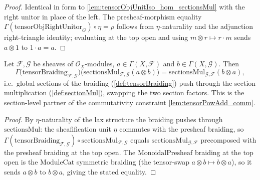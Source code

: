 \begin{proof}
  \leanok
  Identical in form to \cref{lem:tensorObjUnitIso_hom_sectionsMul} with the right
  unitor in place of the left. The presheaf-morphism equality
  \(\Gamma(\mathrm{tensorObjRightUnitor}_G) \circ \eta = \rho\) follows from
  \(\eta\)-naturality and the adjunction right-triangle identity; evaluating at the
  top open and using \(m \otimes r \mapsto r \cdot m\) sends \(a \otimes 1\) to
  \(1 \cdot a = a\).
\end{proof}

\begin{lemma}

  \label{lem:tensorBraiding_hom_sectionsMul}
  Let \(\mathcal{F}, \mathcal{G}\) be sheaves of \(\mathcal{O}_X\)-modules,
  \(a \in \Gamma(X,\mathcal{F})\) and \(b \in \Gamma(X,\mathcal{G})\). Then
  \[
    \Gamma\bigl(\mathrm{tensorBraiding}_{\mathcal{F},\mathcal{G}}\bigr)
      \bigl(\mathrm{sectionsMul}_{\mathcal{F},\mathcal{G}}(a \otimes b)\bigr)
      = \mathrm{sectionsMul}_{\mathcal{G},\mathcal{F}}(b \otimes a),
  \]
  i.e.\ global sections of the braiding (\cref{def:tensorBraiding}) push through
  the section multiplication (\cref{def:sectionMul}), swapping the two section
  factors. This is the section-level partner of the commutativity constraint
  \cref{lem:tensorPowAdd_comm}.
\end{lemma}

\begin{proof}
  \leanok
  By \(\eta\)-naturality of the lax structure the braiding pushes through
  \(\mathrm{sectionsMul}\): the sheafification unit \(\eta\) commutes with the
  presheaf braiding, so \(\Gamma(\mathrm{tensorBraiding}_{\mathcal{F},\mathcal{G}})
  \circ \mathrm{sectionsMul}_{\mathcal{F},\mathcal{G}}\) equals
  \(\mathrm{sectionsMul}_{\mathcal{G},\mathcal{F}}\) precomposed with the
  presheaf braiding at the top open. The
  \(\mathrm{MonoidalPresheaf}\) braiding at the top open is the
  \(\mathrm{ModuleCat}\) symmetric braiding (the tensor-swap
  \(a \otimes b \mapsto b \otimes a\)), so it sends \(a \otimes b\) to
  \(b \otimes a\), giving the stated equality.
\end{proof}

